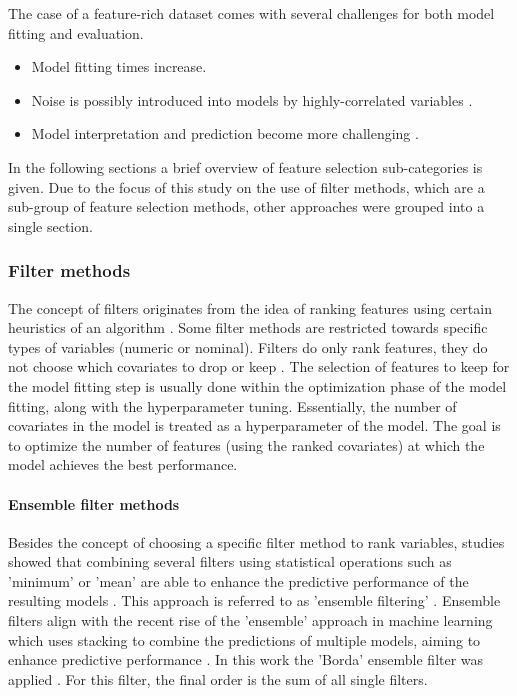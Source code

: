 \documentclass[letterpaper, peerreview]{IEEEtran}
\begin{document}
The case of a feature-rich dataset comes with several challenges for both model fitting and evaluation.

\begin{itemize}
	\item Model fitting times increase.
	\item Noise is possibly introduced into models by highly-correlated variables \cite{johnstoneiainm.2009}.
	\item Model interpretation and prediction become more challenging \cite{johnstoneiainm.2009}.
\end{itemize}

\noindent In the following sections a brief overview of feature selection sub-categories is given.
Due to the focus of this study on the use of filter methods, which are a sub-group of feature selection methods, other approaches were grouped into a single section.

\subsubsection{Filter methods}

\noindent The concept of filters originates from the idea of ranking features using certain heuristics of an algorithm \cite{chandrashekar2014}.
Some filter methods are restricted towards specific types of variables (numeric or nominal).
Filters do only rank features, they do not choose which covariates to drop or keep \cite{drotar2015}.
The selection of features to keep for the model fitting step is usually done within the optimization phase of the model fitting, along with the hyperparameter tuning.
Essentially, the number of covariates in the model is treated as a hyperparameter of the model.
The goal is to optimize the number of features (using the ranked covariates) at which the model achieves the best performance.

\paragraph{Ensemble filter methods}

Besides the concept of choosing a specific filter method to rank variables, studies showed that combining several filters using statistical operations such as 'minimum' or 'mean' are able to enhance the predictive performance of the resulting models \cite{abeel2010, drotar2017a}.
This approach is referred to as 'ensemble filtering' \cite{dietterich2000}.
Ensemble filters align with the recent rise of the 'ensemble' approach in machine learning which uses stacking to combine the predictions of multiple models, aiming to enhance predictive performance \cite{polikar2012, feurer2015}.
In this work the 'Borda' ensemble filter was applied \cite{drotar2017a}.
For this filter, the final order is the sum of all single filters.
\end{document}
